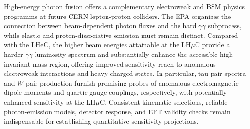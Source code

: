 \documentclass[11pt,a4paper]{article}
\begin{document}
High-energy photon fusion offers a complementary electroweak and BSM
physics programme at future CERN lepton-proton colliders. The EPA
organizes the connection between beam-dependent photon fluxes and
the hard $\gamma\gamma$ subprocess, while elastic and proton-dissociative
emission must remain distinct. Compared with the LHeC, the higher
beam energies attainable at the LH$\mu$C provide a harder
$\gamma\gamma$ luminosity spectrum and substantially enhance the
accessible high-invariant-mass region, offering improved sensitivity
reach to anomalous electroweak interactions and heavy charged states.
In particular, tau-pair spectra and $W$-pair production furnish
promising probes of anomalous electromagnetic dipole moments and
quartic gauge couplings, respectively, with potentially enhanced
sensitivity at the LH$\mu$C. Consistent kinematic selections,
reliable photon-emission models, detector response, and EFT validity
checks remain indispensable for establishing quantitative
sensitivity projections.




\end{document}
